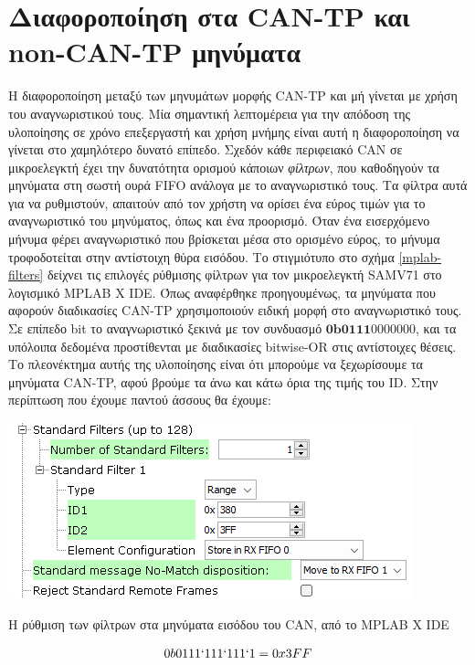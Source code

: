 \documentclass[a4paper,nobib,justified]{tufte-book}
\begin{document}
\section{Διαφοροποίηση στα CAN-TP και non-CAN-TP μηνύματα}

Η διαφοροποίηση μεταξύ των μηνυμάτων μορφής CAN-TP και μή γίνεται με χρήση του αναγνωριστικού τους. Μία σημαντική λεπτομέρεια για την απόδοση της υλοποίησης σε χρόνο επεξεργαστή και χρήση μνήμης είναι αυτή η διαφοροποίηση να γίνεται στο χαμηλότερο δυνατό επίπεδο. Σχεδόν κάθε περιφειακό CAN σε μικροελεγκτή έχει την δυνατότητα ορισμού κάποιων \textit{φίλτρων}, που καθοδηγούν τα μηνύματα στη σωστή ουρά FIFO ανάλογα με το αναγνωριστικό τους. Τα φίλτρα αυτά για να ρυθμιστούν, απαιτούν από τον χρήστη να ορίσει ένα εύρος τιμών για το αναγνωριστικό του μηνύματος, όπως και ένα προορισμό. Όταν ένα εισερχόμενο μήνυμα φέρει αναγνωριστικό που βρίσκεται μέσα στο ορισμένο εύρος, το μήνυμα τροφοδοτείται στην αντίστοιχη θύρα εισόδου. Το στιγμιότυπο στο σχήμα \ref{mplab-filters} δείχνει τις επιλογές ρύθμισης φίλτρων για τον μικροελεγκτή SAMV71 στο λογισμικό MPLAB X IDE. Όπως αναφέρθηκε προηγουμένως, τα μηνύματα που αφορούν διαδικασίες CAN-TP χρησιμοποιούν ειδική μορφή στο αναγνωριστικό τους. Σε επίπεδο bit το αναγνωριστικό ξεκινά με τον συνδυασμό $\textbf{0b0111}0000000$, και τα υπόλοιπα δεδομένα προστίθενται με διαδικασίες bitwise-OR στις αντίστοιχες θέσεις. Το πλεονέκτημα αυτής της υλοποίησης είναι ότι μπορούμε να ξεχωρίσουμε τα μηνύματα CAN-TP, αφού βρούμε τα άνω και κάτω όρια της τιμής του ID. Στην περίπτωση που έχουμε παντού άσσους θα έχουμε:

\begin{marginfigure}
	\includegraphics[width=0.8\linewidth]{media/images/mplab-filters.png}
	\label{mplab-filters}
	\caption{Η ρύθμιση των φίλτρων στα μηνύματα εισόδου του CAN, από το MPLAB X IDE}
\end{marginfigure}

\begin{equation}
0b0111`111`111`1 = 0x3FF
\end{equation}
\end{document}

